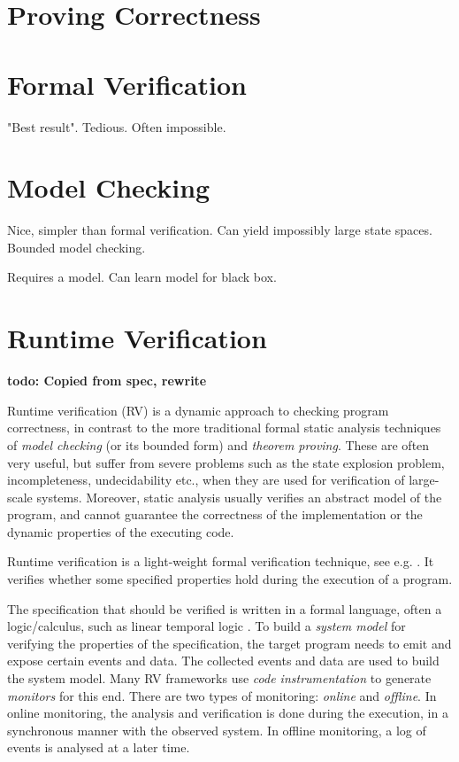 \documentclass[a4paper,11pt]{kth-mag}
\newcommand{\todo}[1]{\textbf{todo: #1}}
\begin{document}
\section{Proving Correctness}

\section{Formal Verification}

"Best result". Tedious. Often impossible.

\section{Model Checking}

Nice, simpler than formal verification. Can yield impossibly large state spaces. Bounded model checking.

Requires a model. Can learn model for black box.

\section{Runtime Verification}

\todo{Copied from spec, rewrite}

Runtime verification (RV) is a dynamic approach to checking program correctness, in contrast to the more 
traditional formal static analysis techniques of \emph{model checking} (or its
bounded form) and \emph{theorem proving}. These are often very useful, but suffer from severe problems such as the
state explosion problem, incompleteness, undecidability etc.,
when they are used for verification of large-scale systems.
Moreover, static analysis usually verifies an abstract model of the program, and cannot guarantee the correctness of the implementation or the dynamic properties of the executing code.

Runtime verification is a light-weight formal verification technique, see e.g. \cite{leucker09abriefaccount,delgado04taxonomy}.
It verifies whether some specified properties hold during the execution of a
program.

The specification that should be verified is written in a formal
language, often a logic/calculus, such as linear temporal logic
\cite{pnueli77}. To build
a \emph{system model} for verifying the properties of the specification, the target program
needs to emit and expose certain events and data. The collected events and data are used to build the system model. Many RV frameworks use \textit{code instrumentation}
to generate \textit{monitors} for this end. There are two types of monitoring:
\emph{online} and \emph{offline}.
In online monitoring, the analysis and verification is done during the execution, in a synchronous
manner with the observed system. In offline monitoring, a log of events is analysed at a later time.
\end{document}
